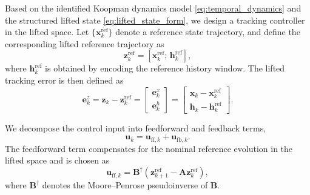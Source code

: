 \documentclass[journal]{IEEEtran}
\newcommand{\vx}{\mathbf{x}}
\newcommand{\vu}{\mathbf{u}}
\newcommand{\vz}{\mathbf{z}}
\newcommand{\vh}{\mathbf{h}}
\newcommand{\ve}{\mathbf{e}}
\newcommand{\mA}{\mathbf{A}}
\newcommand{\mB}{\mathbf{B}}
\begin{document}
Based on the identified Koopman dynamics model \eqref{eq:temporal_dynamics} and the structured lifted state \eqref{eq:lifted_state_form}, we design a tracking controller in the lifted space. Let $\{\vx_k^{\mathrm{ref}}\}$ denote a reference state trajectory, and define the corresponding lifted reference trajectory as
\begin{equation}
    \vz_k^{\mathrm{ref}} = [\vx_k^{\mathrm{ref}};\,\vh_k^{\mathrm{ref}}],
    \label{eq:lifted_reference}
\end{equation}
where $\vh_k^{\mathrm{ref}}$ is obtained by encoding the reference history window. The lifted tracking error is then defined as
\begin{equation}
    \ve_k^z = \vz_k - \vz_k^{\mathrm{ref}}
    =
    \begin{bmatrix}
        \ve_k^x \\ \ve_k^h
    \end{bmatrix}
    =
    \begin{bmatrix}
        \vx_k - \vx_k^{\mathrm{ref}} \\
        \vh_k - \vh_k^{\mathrm{ref}}
    \end{bmatrix}.
    \label{eq:structured_error}
\end{equation}

We decompose the control input into feedforward and feedback terms,
\begin{equation}
    \vu_k = \vu_{\mathrm{ff},k} + \vu_{\mathrm{fb},k}.
    \label{eq:control_decomposition}
\end{equation}
The feedforward term compensates for the nominal reference evolution in the lifted space and is chosen as
\begin{equation}
    \vu_{\mathrm{ff},k}
    =
    \mB^\dagger \!\left(\vz_{k+1}^{\mathrm{ref}} - \mA \vz_k^{\mathrm{ref}}\right),
    \label{eq:feedforward}
\end{equation}
where $\mB^\dagger$ denotes the Moore--Penrose pseudoinverse of $\mB$.
\end{document}
